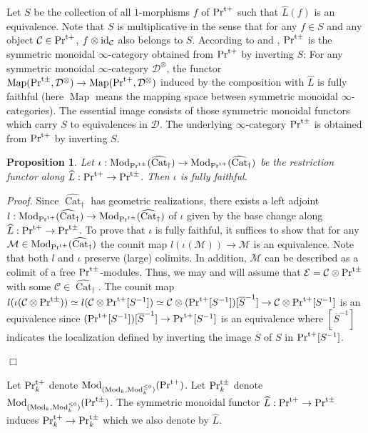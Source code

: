 \documentclass[leqno,12pt]{amsart}
\theoremstyle{plain}
\newtheorem{Proposition}[Theorem]{Proposition}
\theoremstyle{definition}
\newcommand{\DDD}{\mathcal{D}}
\newcommand{\CCC}{\mathcal{C}}
\newcommand{\PRTT}{\textup{Pr}^{\textup{t}+}}
\newcommand{\PRTTT}{\textup{Pr}^{\textup{t}\pm}}
\newcommand{\Mod}{\operatorname{Mod}}
\newcommand{\Map}{\operatorname{Map}}
\newcommand{\vCat}{\widehat{\operatorname{Cat}}_\dagger}
\newcommand{\Proof}{{\sl Proof.}\quad}
\newcommand{\QED}{{\unskip\nobreak\hfil\penalty50\quad\null\nobreak\hfil
{$\Box$}\parfillskip0pt\finalhyphendemerits0\par\medskip}}
\begin{document}
Let $S$ be the collection of all $1$-morphisms $f$ of $\PRTT$ such  that
$\widehat{L}(f)$ is an equivalence. Note that $S$ is multiplicative 
in the sense that for any $f\in S$ and any object $\CCC\in \PRTT$, $f\otimes \textup{id}_{\CCC}$ also belongs to $S$.
According to \cite[5.2.7.12]{HTT} and \cite[1.3.4.1, 4.1.3.4]{HA}, 
$\PRTTT$ is the symmetric monoidal $\infty$-category obtained from $\PRTT$ by inverting $S$:
For any symmetric monoidal $\infty$-category $\mathcal{D}^\otimes$, 
the functor $\Map(\PRTTT, \DDD^\otimes)\to \Map(\PRTT, \DDD^\otimes)$
induced by the composition with $\widehat{L}$ is
fully faithful (here $\Map$ means the mapping space between symmetric monoidal $\infty$-categories).
The essential image consists of those symmetric monoidal functors which carry $S$ to equivalences in $\DDD$.
The underlying $\infty$-category $\PRTTT$ is obtained from $\PRTT$ by inverting $S$.



\begin{Proposition}
Let $\iota:\Mod_{\PRTTT}(\vCat)\to \Mod_{\PRTT}(\vCat)$ be the restriction functor along $\widehat{L}:\PRTT\to \PRTTT$.
Then $\iota$ is fully faithful.
\end{Proposition}


\Proof
Since $\vCat$ has geometric realizations,
there exists a left adjoint $l:\Mod_{\PRTT}(\vCat)\to \Mod_{\PRTTT}(\vCat)$ of $\iota$ given by the base change along $\widehat{L}:\PRTT\to \PRTTT$.
To prove that $\iota$ is fully faithful, it suffices to show that for any $\mathcal{M}\in \Mod_{\PRTTT}(\vCat)$
the counit map $l(\iota(\mathcal{M}))\to \mathcal{M}$ is an equivalence.
Note that both $l$ and $\iota$ preserve (large) colimits. 
In addition, $\mathcal{M}$ can be described as a colimit of a free $\PRTTT$-modules.
Thus, we may and will assume that $\mathcal{E}=\CCC\otimes \PRTTT$ with some $\CCC\in \vCat$.
The counit map $l(\iota( \CCC\otimes \PRTTT)) \simeq l(\CCC\otimes \PRTT[S^{-1}])\simeq  \CCC\otimes (\PRTT[S^{-1}])[\overline{S}^{-1}]\to  \CCC\otimes \PRTT[S^{-1}]$
is an equivalence since $(\PRTT[S^{-1}])[\overline{S}^{-1}]\to  \PRTT[S^{-1}]$ is an equivalence where $[\overline{S}^{-1}]$ indicates the localization
defined by inverting the image $\overline{S}$ of $S$ in $\PRTT[S^{-1}]$.
\QED



Let $\PRTT_k$ denote $\Mod_{(\Mod_k,\Mod_k^{\le0})}(\PRTT)$.
Let $\PRTTT_k$ denote $\Mod_{(\Mod_k,\Mod_k^{\le0})}(\PRTTT)$.
The symmetric monoidal functor $\widehat{L}:\PRTT\to \PRTTT$ induces $\PRTT_k\to \PRTTT_k$ which we also denote by $\widehat{L}$.
\end{document}
